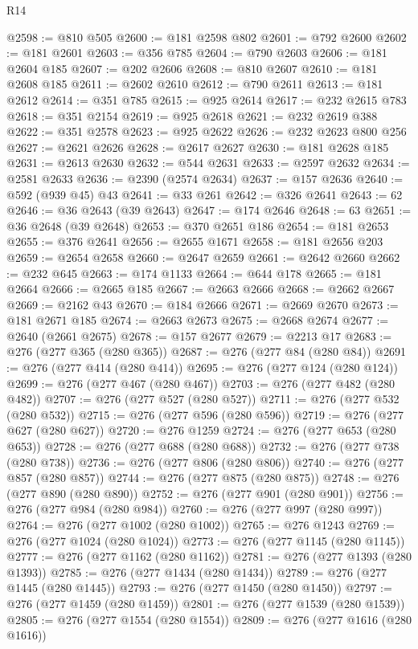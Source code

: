 \begin{lexlean}{R14}
\begin{coremodule}
@2598 := @810 @505
@2600 := @181 @2598 @802
@2601 := @792 @2600
@2602 := @181 @2601
@2603 := @356 @785
@2604 := @790 @2603
@2606 := @181 @2604 @185
@2607 := @202 @2606
@2608 := @810 @2607
@2610 := @181 @2608 @185
@2611 := @2602 @2610
@2612 := @790 @2611
@2613 := @181 @2612
@2614 := @351 @785
@2615 := @925 @2614
@2617 := @232 @2615 @783
@2618 := @351 @2154
@2619 := @925 @2618
@2621 := @232 @2619 @388
@2622 := @351 @2578
@2623 := @925 @2622
@2626 := @232 @2623 @800 @256
@2627 := @2621 @2626
@2628 := @2617 @2627
@2630 := @181 @2628 @185
@2631 := @2613 @2630
@2632 := @544 @2631
@2633 := @2597 @2632
@2634 := @2581 @2633
@2636 := @2390 (@2574 @2634)
@2637 := @157 @2636
@2640 := @592 (@939 @45) @43
@2641 := @33 @261
@2642 := @326 @2641
@2643 := 62
@2646 := @36 @2643 (@39 @2643)
@2647 := @174 @2646
@2648 := 63
@2651 := @36 @2648 (@39 @2648)
@2653 := @370 @2651 @186
@2654 := @181 @2653
@2655 := @376 @2641
@2656 := @2655 @1671
@2658 := @181 @2656 @203
@2659 := @2654 @2658
@2660 := @2647 @2659
@2661 := @2642 @2660
@2662 := @232 @645
@2663 := @174 @1133
@2664 := @644 @178
@2665 := @181 @2664
@2666 := @2665 @185
@2667 := @2663 @2666
@2668 := @2662 @2667
@2669 := @2162 @43
@2670 := @184 @2666
@2671 := @2669 @2670
@2673 := @181 @2671 @185
@2674 := @2663 @2673
@2675 := @2668 @2674
@2677 := @2640 (@2661 @2675)
@2678 := @157 @2677
@2679 := @2213 @17
@2683 := @276 (@277 @365 (@280 @365))
@2687 := @276 (@277 @84 (@280 @84))
@2691 := @276 (@277 @414 (@280 @414))
@2695 := @276 (@277 @124 (@280 @124))
@2699 := @276 (@277 @467 (@280 @467))
@2703 := @276 (@277 @482 (@280 @482))
@2707 := @276 (@277 @527 (@280 @527))
@2711 := @276 (@277 @532 (@280 @532))
@2715 := @276 (@277 @596 (@280 @596))
@2719 := @276 (@277 @627 (@280 @627))
@2720 := @276 @1259
@2724 := @276 (@277 @653 (@280 @653))
@2728 := @276 (@277 @688 (@280 @688))
@2732 := @276 (@277 @738 (@280 @738))
@2736 := @276 (@277 @806 (@280 @806))
@2740 := @276 (@277 @857 (@280 @857))
@2744 := @276 (@277 @875 (@280 @875))
@2748 := @276 (@277 @890 (@280 @890))
@2752 := @276 (@277 @901 (@280 @901))
@2756 := @276 (@277 @984 (@280 @984))
@2760 := @276 (@277 @997 (@280 @997))
@2764 := @276 (@277 @1002 (@280 @1002))
@2765 := @276 @1243
@2769 := @276 (@277 @1024 (@280 @1024))
@2773 := @276 (@277 @1145 (@280 @1145))
@2777 := @276 (@277 @1162 (@280 @1162))
@2781 := @276 (@277 @1393 (@280 @1393))
@2785 := @276 (@277 @1434 (@280 @1434))
@2789 := @276 (@277 @1445 (@280 @1445))
@2793 := @276 (@277 @1450 (@280 @1450))
@2797 := @276 (@277 @1459 (@280 @1459))
@2801 := @276 (@277 @1539 (@280 @1539))
@2805 := @276 (@277 @1554 (@280 @1554))
@2809 := @276 (@277 @1616 (@280 @1616))

\end{coremodule}
\end{lexlean}
